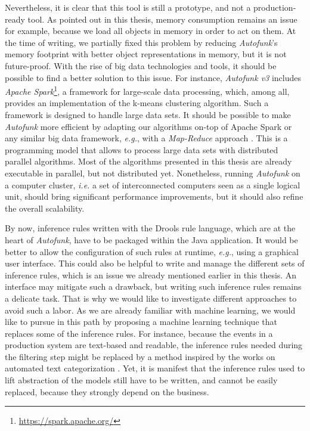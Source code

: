 Nevertheless, it is clear that this tool is still a prototype,
and not a production-ready tool. As pointed out in this thesis,
memory consumption remains an issue for example, because we load
all objects in memory in order to act on them. At the time of
writing, we partially fixed this problem by reducing
\emph{Autofunk}'s memory footprint with better object
representations in memory, but it is not future-proof.
With the rise of big data technologies and tools, it should be
possible to find a better solution to this issue. For instance,
\emph{Autofunk v3} includes \emph{Apache
Spark}\footnote{\url{https://spark.apache.org/}}, a framework for
large-scale data processing, which, among all, provides an
implementation of the k-means clustering algorithm.  Such a
framework is designed to handle large data sets. It should be
possible to make \emph{Autofunk} more efficient by adapting our
algorithms on-top of Apache Spark or any similar big data
framework, \emph{e.g.}, with a \emph{Map-Reduce} approach
\cite{dean2008mapreduce}. This is a programming model that allows
to process large data sets with distributed parallel algorithms.
Most of the algorithms presented in this thesis are already
executable in parallel, but not distributed yet. Nonetheless,
running \emph{Autofunk} on a computer cluster, \emph{i.e.} a set
of interconnected computers seen as a single logical unit, should
bring significant performance improvements, but it should also
refine the overall scalability.

By now, inference rules written with the Drools rule language,
which are at the heart of \emph{Autofunk}, have to be packaged
within the Java application. It would be better to allow the
configuration of such rules at runtime, \emph{e.g.}, using a
graphical user interface. This could also be helpful to write and
manage the different sets of inference rules, which is an issue
we already mentioned earlier in this thesis. An interface may
mitigate such a drawback, but writing such inference rules
remains a delicate task. That is why we would like to investigate
different approaches to avoid such a labor. As we are already
familiar with machine learning, we would like to pursue in this
path by proposing a machine learning technique that replaces some
of the inference rules. For instance, because the events in a
production system are text-based and readable, the inference
rules needed during the filtering step might be replaced by a
method inspired by the works on automated text categorization
\cite{Sebastiani:2002:MLA:505282.505283}. Yet, it is manifest
that the inference rules used to lift abstraction of the models
still have to be written, and cannot be easily replaced, because
they strongly depend on the business.

